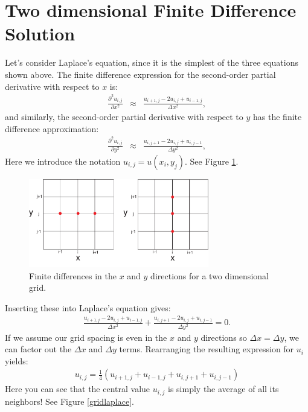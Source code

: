 \documentclass[11pt, oneside]{article}   	%
\begin{document}
\section*{Two dimensional Finite Difference Solution}
Let's consider Laplace's equation, since it is the simplest of the three equations shown above. The finite difference expression for the second-order partial derivative with respect to $x$ is:
\begin{eqnarray}
	\frac{\partial^2 u_{i,j}}{\partial x^2}  & \approx& \frac{u_{i+1,j} - 2 u_{i,j}+ u_{i-1,j}  }{\Delta x^2},  
\end{eqnarray}
and similarly, the second-order partial derivative with respect to $y$ has the finite difference approximation:
\begin{eqnarray}
	\frac{\partial^2 u_{i,j}}{\partial y^2}  & \approx& \frac{u_{i,j+1} - 2 u_{i,j} + u_{i,j-1}  }{\Delta y^2}  ,
\end{eqnarray}
Here we introduce the notation $u_{i,j} = u(x_i,y_j)$. See Figure \ref{grid}.

\begin{figure}[htbp]
\begin{center}
\includegraphics[width=0.7\textwidth]{grid_x.pdf} 
\caption{ Finite differences in the $x$ and $y$  directions for a two dimensional grid. }
\label{grid}
\end{center}
\end{figure}

Inserting these into Laplace's equation gives:
\begin{eqnarray}
	     \frac{u_{i+1,j} - 2 u_{i,j}+ u_{i-1,j}  }{\Delta x^2}  +  \frac{u_{i,j+1} - 2 u_{i,j} + u_{i,j-1}  }{\Delta y^2}   = 0.
\end{eqnarray}
If we assume our grid spacing is even in the $x$ and $y$ directions so $\Delta x = \Delta y$, we can factor out the $\Delta x$ and $\Delta y$ terms. Rearranging the resulting expression  for $u_i$ yields:
\begin{eqnarray}
	 u_{i,j}    =  \frac{1}{4} \left ( u_{i+1,j}  + u_{i-1,j}  + u_{i,j+1}   + u_{i,j-1} \right )    
\end{eqnarray}
Here you can see that the central value $u_{i,j}$ is simply the average of all its neighbors!  See Figure \ref{gridlaplace}.
\end{document}
